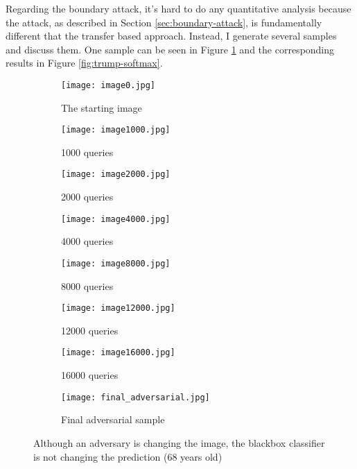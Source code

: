 Regarding the boundary attack, it's hard to do any quantitative analysis because the attack, as described in Section \ref{sec:boundary-attack}, is fundamentally different that the transfer based approach. Instead, I generate several samples and discuss them. One sample can be seen in Figure \ref{fig:trump-adv} and the corresponding results in Figure \ref{fig:trump-softmax}. 
\begin{figure}
\begin{subfigure}{.5\textwidth}
  \centering%
  \texttt{[image: image0.jpg]}
  \caption{The starting image}
\end{subfigure}
\begin{subfigure}{.5\textwidth}
  \centering
  \texttt{[image: image1000.jpg]}
  \caption{1000 queries}
\end{subfigure}

\begin{subfigure}{.5\textwidth}
  \centering
  \texttt{[image: image2000.jpg]}
  \caption{2000 queries}
\end{subfigure}
\begin{subfigure}{.5\textwidth}
  \centering
  \texttt{[image: image4000.jpg]}
  \caption{4000 queries}
\end{subfigure}

\begin{subfigure}{.5\textwidth}
  \centering
  \texttt{[image: image8000.jpg]}
  \caption{8000 queries}
\end{subfigure}
\begin{subfigure}{.5\textwidth}
  \centering
  \texttt{[image: image12000.jpg]}
  \caption{12000 queries}
\end{subfigure}

\begin{subfigure}{.5\textwidth}
  \centering
  \texttt{[image: image16000.jpg]}
  \caption{16000 queries}
\end{subfigure}
\begin{subfigure}{.5\textwidth}
  \centering
  \texttt{[image: final\_adversarial.jpg]}
  \caption{Final adversarial sample}
\end{subfigure}
\caption{Although an adversary is changing the image, the blackbox classifier is not changing the prediction (68 years old)}
\label{fig:trump-adv}
\end{figure}


